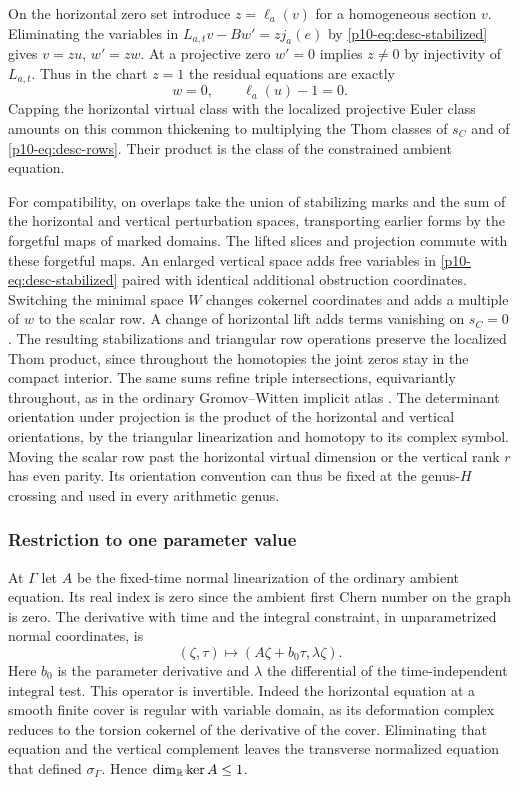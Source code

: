 On the horizontal zero set introduce $z=\ell_a(v)$ for a homogeneous
section $v$. Eliminating the variables in
$L_{a,t}v-Bw'=zj_a(e)$ by \eqref{p10-eq:desc-stabilized} gives
$v=zu$, $w'=zw$. At a projective zero $w'=0$ implies $z\ne0$ by
injectivity of $L_{a,t}$. Thus in the chart $z=1$ the residual
equations are exactly
\begin{equation}\label{p10-eq:desc-rows}
                           w=0,\qquad \ell_a(u)-1=0 .
\end{equation}
Capping the horizontal virtual class with the localized projective
Euler class amounts on this common thickening to multiplying the
Thom classes of $s_C$ and of \eqref{p10-eq:desc-rows}. Their product is
the class of the constrained ambient equation.

For compatibility, on overlaps take the union of stabilizing marks
and the sum of the horizontal and vertical perturbation spaces,
transporting earlier forms by the forgetful maps of marked domains.
The lifted slices and projection commute with these forgetful maps.
An enlarged vertical space adds free variables in
\eqref{p10-eq:desc-stabilized} paired with identical additional
obstruction coordinates. Switching the minimal space $W$ changes
cokernel coordinates and adds a multiple of $w$ to the scalar row.
A change of horizontal lift adds terms vanishing on $s_C=0$.
The resulting stabilizations and triangular row operations preserve
the localized Thom product, since throughout the homotopies the
joint zeros stay in the compact interior. The same sums refine triple
intersections, equivariantly throughout, as in the ordinary
Gromov--Witten implicit atlas \cite[\S9.2, Theorem~9.2.10]{pardonatlas}.
The determinant orientation under projection is the product of the
horizontal and vertical orientations, by the triangular
linearization and homotopy to its complex symbol. Moving the scalar
row past the horizontal virtual dimension or the vertical rank $r$
has even parity. Its orientation convention can thus be fixed at
the genus-$H$ crossing and used in every arithmetic genus.

\subsubsection{Restriction to one parameter value}
At $\Gamma$ let $A$ be the fixed-time normal linearization of the
ordinary ambient equation. Its real index is zero since the ambient
first Chern number on the graph is zero. The derivative with time and
the integral constraint, in unparametrized normal coordinates, is
\begin{equation}\label{p10-eq:desc-augmented}
 (\zeta,\tau)\longmapsto
          (A\zeta+b_0\tau,\lambda\zeta).
\end{equation}
Here $b_0$ is the parameter derivative and $\lambda$ the differential
of the time-independent integral test. This operator is invertible.
Indeed the horizontal equation at a smooth finite cover is regular
with variable domain, as its deformation complex reduces to the
torsion cokernel of the derivative of the cover. Eliminating that
equation and the vertical complement leaves the transverse normalized
equation that defined $\sigma_\Gamma$. Hence $\dim_{\mathbb R}\ker A\le1$.

